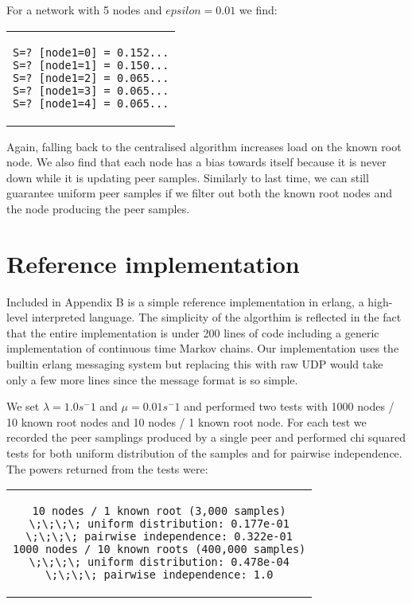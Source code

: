 \documentclass[a4paper,10pt]{article}
\newcommand{\code}[1]{
  \footnotesize
  
}
\newcommand{\prismmodel}[1]{
  \begin{quotation}
  \code{../models/#1.sm}
  \end{quotation}
}
\newenvironment{prismprop}[0]{
  \begin{center}
  \begin{tabular}{c}
  \footnotesize
}{
  \end{tabular}
  \end{center}
}
\begin{document}
\prismmodel{ctmc_full_churn}

For a network with 5 nodes and $epsilon=0.01$ we find:

\begin{prismprop}
\begin{lstlisting}
S=? [node1=0] = 0.152...
S=? [node1=1] = 0.150...
S=? [node1=2] = 0.065...
S=? [node1=3] = 0.065...
S=? [node1=4] = 0.065...
\end{lstlisting}
\end{prismprop}

Again, falling back to the centralised algorithm increases load on the known root node. We also find that each node has a bias towards itself because it is never down while it is updating peer samples. Similarly to last time, we can still guarantee uniform peer samples if we filter out both the known root nodes and the node producing the peer samples.

\section{Reference implementation}

Included in Appendix B is a simple reference implementation in erlang, a high-level interpreted language. The simplicity of the algorthim is reflected in the fact that the entire implementation is under 200 lines of code including a generic implementation of continuous time Markov chains. Our implementation uses the builtin erlang messaging system but replacing this with raw UDP would take only a few more lines since the message format is so simple. 

We set $\lambda=1.0 s^-1$ and $\mu=0.01 s^-1$ and performed two tests with 1000 nodes / 10 known root nodes and 10 nodes / 1 known root node. For each test we recorded the peer samplings produced by a single peer and performed chi squared tests for both uniform distribution of the samples and for pairwise independence. The powers returned from the tests were:

\begin{prismprop}
\begin{lstlisting}
10 nodes / 1 known root (3,000 samples)
\;\;\;\; uniform distribution: 0.177e-01
\;\;\;\; pairwise independence: 0.322e-01
1000 nodes / 10 known roots (400,000 samples)
\;\;\;\; uniform distribution: 0.478e-04
\;\;\;\; pairwise independence: 1.0
\end{lstlisting}
\end{prismprop}
\end{document}

